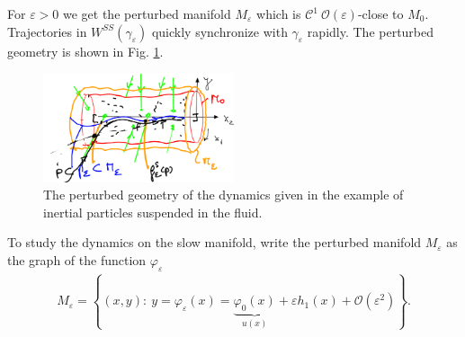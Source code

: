 \begin{ex}
For $\varepsilon>0$ we get the perturbed manifold $M_{\varepsilon}$ which is $\mathcal{C}^{1}\ \mathcal{O}(\varepsilon)$-close to $M_0$. Trajectories in $W^{SS}(\gamma_{\varepsilon})$ quickly synchronize with $\gamma_{\varepsilon}$ rapidly. The perturbed geometry is shown in Fig. \ref{fig:perturbed_fluid_geometry}.

\begin{figure}[h!]
	\centering
	\includegraphics[width=0.5\textwidth]{figures/ch9/22perturbed_fluid_geometry.png}
	\caption{The perturbed geometry of the dynamics given in the example of inertial particles suspended in the fluid.}
	\label{fig:perturbed_fluid_geometry}
\end{figure}

To study the dynamics on the slow manifold, write the perturbed manifold $M_{\varepsilon}$ as the graph of the function $\varphi_{\varepsilon}$
\begin{align}
	M_{\varepsilon} = \left\{ (x,y):\ y=\varphi_{\varepsilon}(x)=\underbrace{\varphi_0(x)}_{u(x)} + \varepsilon h_{1}(x) + \mathcal{O}(\varepsilon^{2}) \right\}.
\end{align}


\end{ex}
